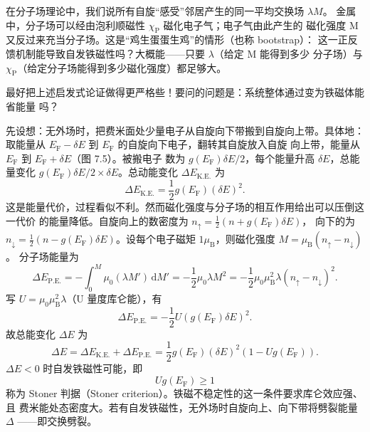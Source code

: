 在分子场理论中，我们说所有自旋“感受”邻居产生的同一平均交换场 $\lambda M$。
金属中，分子场可以经由泡利顺磁性 $\chi_{\mathrm{P}}$ 磁化电子气；电子气由此产生的
磁化强度 M 又反过来充当分子场。这是“鸡生蛋蛋生鸡”的情形（也称 bootstrap）：
这一正反馈机制能导致自发铁磁性吗？大概能——只要 $\lambda$（给定 M 能得到多少
分子场）与 $\chi_{\mathrm{P}}$（给定分子场能得到多少磁化强度）都足够大。

最好把上述启发式论证做得更严格些！要问的问题是：系统整体通过变为铁磁体能省能量
吗？

先设想：无外场时，把费米面处少量电子从自旋向下带搬到自旋向上带。具体地：取能量从
$E_{\mathrm{F}}-\delta E$ 到 $E_{\mathrm{F}}$ 的自旋向下电子，翻转其自旋放入自旋
向上带，能量从 $E_{\mathrm{F}}$ 到 $E_{\mathrm{F}}+\delta E$（图 7.5）。被搬电子
数为 $g(E_{\mathrm{F}})\delta E/2$，每个能量升高 $\delta E$，总能量变化
$g(E_{\mathrm{F}})\delta E/2\times\delta E$。总动能变化 $\Delta E_{\mathrm{K.E.}}$
为
\begin{equation*}
\Delta E_{\mathrm{K.E.}} = \frac{1}{2}g(E_{\mathrm{F}})(\delta E)^{2}.\tag{7.25}
\end{equation*}
这是能量代价，过程看似不利。然而磁化强度与分子场的相互作用给出可以压倒这一代价
的能量降低。自旋向上的数密度为 $n_{\uparrow}=\frac{1}{2}(n+g(E_{\mathrm{F}})\delta E)$，
向下的为 $n_{\downarrow}=\frac{1}{2}(n-g(E_{\mathrm{F}})\delta E)$。设每个电子磁矩
$1\mu_{\mathrm{B}}$，则磁化强度 $M=\mu_{\mathrm{B}}(n_{\uparrow}-n_{\downarrow})$。
分子场能量为
\begin{equation*}
\Delta E_{\mathrm{P.E.}} = -\int_{0}^{M}\mu_0(\lambda M')\,\mathrm{d}M' = -\frac{1}{2}\mu_0\lambda M^{2} = -\frac{1}{2}\mu_0\mu_{\mathrm{B}}^{2}\lambda(n_{\uparrow}-n_{\downarrow})^{2}.\tag{7.26}
\end{equation*}
写 $U=\mu_0\mu_{\mathrm{B}}^{2}\lambda$（U 量度库仑能），有
\begin{equation*}
\Delta E_{\mathrm{P.E.}} = -\frac{1}{2}U(g(E_{\mathrm{F}})\delta E)^{2}.\tag{7.27}
\end{equation*}
故总能变化 $\Delta E$ 为
\begin{equation*}
\Delta E = \Delta E_{\mathrm{K.E.}}+\Delta E_{\mathrm{P.E.}} = \frac{1}{2}g(E_{\mathrm{F}})(\delta E)^{2}(1-Ug(E_{\mathrm{F}})).\tag{7.28}
\end{equation*}
$\Delta E<0$ 时自发铁磁性可能，即
\begin{equation*}
Ug(E_{\mathrm{F}}) \geq 1\tag{7.29}
\end{equation*}
称为 Stoner 判据（Stoner criterion）。铁磁不稳定性的这一条件要求库仑效应强、且
费米能处态密度大。若有自发铁磁性，无外场时自旋向上、向下带将劈裂能量 $\Delta$
——即交换劈裂。

